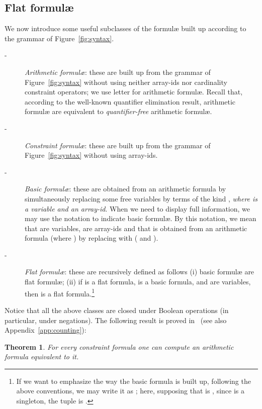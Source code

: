 \documentclass[11pt,a4paper]{article}
\newcommand{\formulae}{formul\ae\xspace}
\newtheorem{theorem}{Theorem}
\begin{document}
\subsection{Flat  \formulae}
We now introduce some useful subclasses
of the \formulae built up according to the grammar of Figure~\ref{fig:syntax}.
\begin{description}
  \item[-] \emph{Arithmetic \formulae}: these are built up from the  grammar of Figure~\ref{fig:syntax} without using
 neither array-ids nor cardinality constraint operators; we use letter  for
 arithmetic \formulae. Recall that, according to the well-known quantifier elimination result, arithmetic \formulae are equivalent 
 to \emph{quantifier-free} arithmetic \formulae. 
  \item[-] \emph{Constraint \formulae}: these are built up from the  grammar of Figure~\ref{fig:syntax} without using
 array-ids.
  \item[-] \emph{Basic \formulae}: these are obtained from an arithmetic formula by simultaneously replacing some free variables by terms of the kind , \emph{where  is a variable
  and  an array-id}. When we need to display full information, we may use the notation   to indicate basic \formulae. By this notation, we mean that  are variables,
 are array-ids and that  is obtained from an arithmetic formula  (where )
by replacing  with  ( and ). 
\item[-] \emph{Flat \formulae}: these are recursively defined as follows (i) basic \formulae are flat \formulae; (ii) if  is 
a flat  formula,  is a basic formula,  and  are variables, 
  then  is 
a flat formula.\footnote{ If we want to emphasize the way 
the basic formula
   is built up, 
  following the above conventions,
  we may write it as 
; here, supposing that  
   is , since  is a singleton, the tuple
   is .
  }
 \end{description}

Notice that all the above classes are closed under Boolean operations (in particular, under negations). 
The following result is proved in~\cite{schweikhart} (see also Appendix~\ref{app:counting}):

\begin{theorem}\label{thm:NS}
 For every constraint formula one can compute an arithmetic formula equivalent to it.
\end{theorem} 
 
\end{document}
